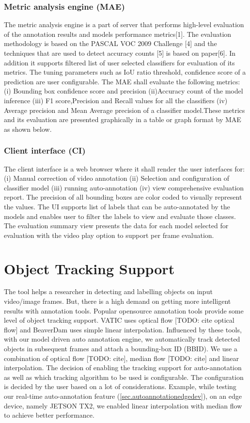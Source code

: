 \documentclass[conference]{IEEEtran}
\begin{document}
\subsubsection{Metric analysis engine (MAE)}
The metric analysis engine is a part of server that performs high-level evaluation of the annotation results and models performance metrics[1].  The evaluation methodology is based on the PASCAL VOC 2009 Challenge [4] and the techniques that are used to detect accuracy counts [5] is based on paper[6]. In addition it supports filtered list of user selected classifiers for evaluation of its metrics. The tuning parameters such as IoU ratio threshold, confidence score of a prediction are user configurable. The MAE shall evaluate the following metrics:
(i) Bounding box confidence score and precision (ii)Accuracy count of the model inference (iii) F1 score,Precision and Recall values for all the classifiers (iv) Average precision and Mean Average precision of a classifier model.These metrics and its evaluation are presented graphically in a table or graph format by MAE as shown below. 
\subsubsection{Client interface (CI)}
The client interface is a web browser where it shall render the user interfaces for: (i) Manual correction of video annotation (ii) Selection and configuration of classifier model (iii) running auto-annotation (iv) view comprehensive evaluation report. The precision of all bounding boxes are color coded to visually represent the values. The UI supports list of labels that can be auto-annotated by the models and enables user to filter the labels to view and evaluate those classes. The evaluation summary view presents the data for each model selected for evaluation with the video play option to support per frame evaluation. 

\section{Object Tracking Support}\label{sec.objtrack}
The tool helps a researcher in detecting and labelling objects on input video/image frames. But, there is a high demand on getting more intelligent results with annotation tools. 
Popular opensource annotation tools provide some level of object tracking support. VATIC \cite{carl2012vatic} uses optical flow [TODO: cite optical flow] 
and BeaverDam \cite{shen2016beaverdam} uses simple linear interpolation. 
Influenced by these tools, with our model driven auto annotation engine, we automatically track detected objects in subsequent frames and attach a bounding-box ID (BBID). 
We use a combination of optical flow [TODO: cite], median flow [TODO: cite] and linear interpolation. 
The decision of enabling the tracking support for auto-annotation as well as which tracking algorithm to be used is configurable. 
The configuration is decided by the user based on a lot of considerations. 
Example, while testing our real-time auto-annotation feature (\ref{sec.autoannotationedgedev}), on an edge device, namely JETSON TX2, we enabled linear interpolation with median flow to achieve 
better performance.
\end{document}
